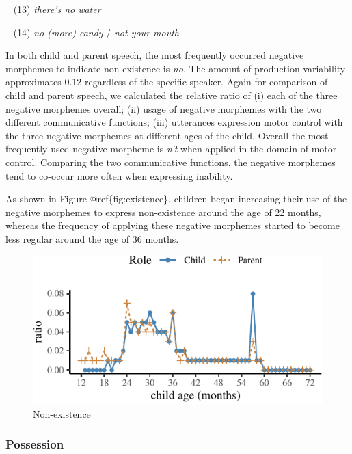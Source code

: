 \documentclass[10pt, letterpaper]{article}
\newenvironment{CodeChunk}{}{}
\begin{document}
~ (13) \emph{there's no water}

~ (14) \emph{no (more) candy} / \emph{not your mouth}

In both child and parent speech, the most frequently occurred negative
morphemes to indicate non-existence is \emph{no}. The amount of
production variability approximates 0.12 regardless of the specific
speaker. Again for comparison of child and parent speech, we calculated
the relative ratio of (i) each of the three negative morphemes overall;
(ii) usage of negative morphemes with the two different communicative
functions; (iii) utterances expression motor control with the three
negative morphemes at different ages of the child. Overall the most
frequently used negative morpheme is \emph{n't} when applied in the
domain of motor control. Comparing the two communicative functions, the
negative morphemes tend to co-occur more often when expressing
inability.

As shown in Figure @ref\{fig:existence\}, children began increasing
their use of the negative morphemes to express non-existence around the
age of 22 months, whereas the frequency of applying these negative
morphemes started to become less regular around the age of 36 months.

\begin{CodeChunk}
\begin{figure}[H]

{\centering \includegraphics{figs/existence-1} 

}

\caption[Non-existence]{Non-existence}\label{fig:existence}
\end{figure}
\end{CodeChunk}

\hypertarget{possession}{%
\subsubsection{Possession}\label{possession}}
\end{document}
